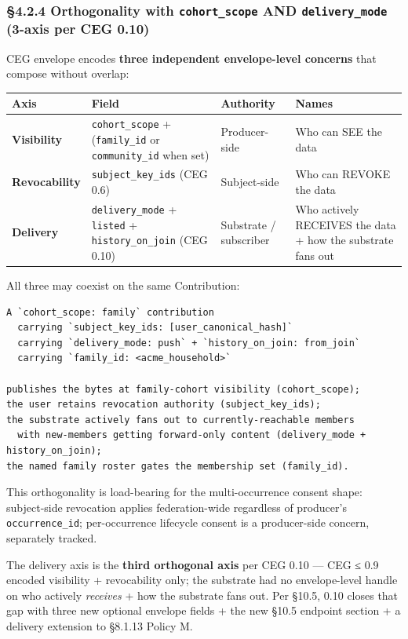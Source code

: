 \documentclass[11pt]{article}
\begin{document}
\subsubsection*{§4.2.4 Orthogonality with \texttt{cohort\_scope} AND \texttt{delivery\_mode} (3-axis per CEG 0.10)}


CEG envelope encodes \textbf{three independent envelope-level concerns} that compose without overlap:


{\scriptsize
\begin{longtable}{|p{4.0cm}|p{4.0cm}|p{4.0cm}|p{4.0cm}|}\hline
\textbf{Axis} & \textbf{Field} & \textbf{Authority} & \textbf{Names} \\ \hline\endhead
\textbf{Visibility} & \texttt{cohort\_scope} + (\texttt{family\_id} or \texttt{community\_id} when set) & Producer-side & Who can SEE the data \\ \hline
\textbf{Revocability} & \texttt{subject\_key\_ids} (CEG 0.6) & Subject-side & Who can REVOKE the data \\ \hline
\textbf{Delivery} & \texttt{delivery\_mode} + \texttt{listed} + \texttt{history\_on\_join} (CEG 0.10) & Substrate / subscriber & Who actively RECEIVES the data + how the substrate fans out \\ \hline
\end{longtable}}


All three may coexist on the same Contribution:


\begin{lstlisting}
A `cohort_scope: family` contribution
  carrying `subject_key_ids: [user_canonical_hash]`
  carrying `delivery_mode: push` + `history_on_join: from_join`
  carrying `family_id: <acme_household>`

publishes the bytes at family-cohort visibility (cohort_scope);
the user retains revocation authority (subject_key_ids);
the substrate actively fans out to currently-reachable members
  with new-members getting forward-only content (delivery_mode + history_on_join);
the named family roster gates the membership set (family_id).
\end{lstlisting}

This orthogonality is load-bearing for the multi-occurrence consent shape: subject-side revocation applies federation-wide regardless of producer's \texttt{occurrence\_id}; per-occurrence lifecycle consent is a producer-side concern, separately tracked.


The delivery axis is the \textbf{third orthogonal axis} per CEG 0.10 — CEG ≤ 0.9 encoded visibility + revocability only; the substrate had no envelope-level handle on who actively \textit{receives} + how the substrate fans out. Per §10.5, 0.10 closes that gap with three new optional envelope fields + the new §10.5 endpoint section + a delivery extension to §8.1.13 Policy M.
\end{document}

